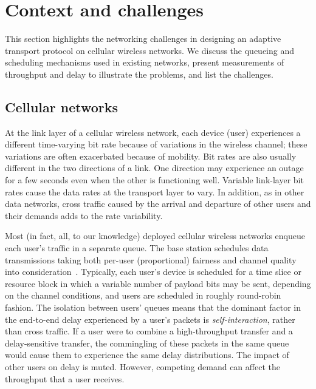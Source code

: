 \section{Context and challenges}
\label{sprout:problem}

This section highlights the networking challenges in designing an
adaptive transport protocol on cellular wireless networks. We discuss
the queueing and scheduling mechanisms used in existing networks,
present measurements of throughput and delay to illustrate the
problems, and list the challenges.

\subsection{Cellular networks}

At the link layer of a cellular wireless network, each device (user)
experiences a different time-varying bit rate because of variations in
the wireless channel; these variations are often exacerbated because of
mobility. Bit rates are also usually different in the two directions
of a link. One direction may experience an outage for a few seconds
even when the other is functioning well. Variable link-layer bit rates
cause the data rates at the transport layer to vary. In addition, as
in other data networks, cross traffic caused by the arrival and
departure of other users and their demands adds to the rate
variability.

Most (in fact, all, to our knowledge) deployed cellular wireless
networks enqueue each user's traffic in a separate queue. The base
station schedules data transmissions taking both per-user
(proportional) fairness and channel quality into
consideration~\cite{propfair}. Typically, each user's device is
scheduled for a time slice or resource block in which a variable number of
payload bits may be sent, depending on the channel conditions, and
users are scheduled in roughly round-robin fashion. The isolation
between users' queues means that the dominant factor in the end-to-end
delay experienced by a user's packets is {\em self-interaction},
rather than cross traffic. If a user were to combine a high-throughput
transfer and a delay-sensitive transfer, the commingling of these
packets in the same queue would cause them to experience the same
delay distributions. The impact of other users on delay is
muted. However, competing demand can affect the throughput that a user
receives.

